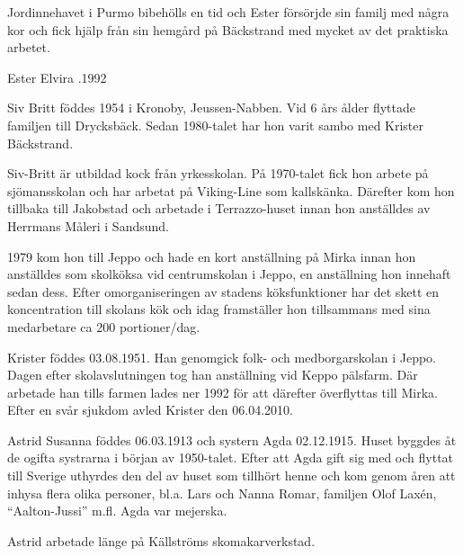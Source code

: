 Jordinnehavet i Purmo bibehölls en tid och Ester försörjde sin familj med några kor och fick hjälp från sin hemgård på Bäckstrand med mycket av det praktiska arbetet.

Ester Elvira .1992






Siv Britt föddes 1954 i Kronoby, Jeussen-Nabben. Vid 6 års ålder flyttade familjen till Drycksbäck. Sedan 1980-talet har hon varit sambo med Krister Bäckstrand.

Siv-Britt är utbildad kock från yrkesskolan. På 1970-talet fick hon arbete på sjömansskolan och  har arbetat på Viking-Line som kallskänka. Därefter kom hon tillbaka till Jakobstad och arbetade i Terrazzo-huset innan hon anställdes av Herrmans Måleri i Sandsund.

1979 kom hon till Jeppo och hade en kort anställning på Mirka innan hon anställdes som skolköksa vid centrumskolan i Jeppo, en anställning hon innehaft sedan dess. Efter omorganiseringen av stadens köksfunktioner har det skett en koncentration till skolans kök och idag framställer hon tillsammans med sina medarbetare ca 200 portioner/dag.


Krister föddes 03.08.1951. Han genomgick folk- och medborgarskolan i Jeppo. Dagen efter skolavslutningen tog han anställning vid Keppo pälsfarm. Där arbetade han tills farmen lades ner 1992 för att därefter överflyttas till Mirka. Efter en svår sjukdom avled Krister den 06.04.2010.


Astrid Susanna föddes 06.03.1913 och systern Agda 02.12.1915. Huset byggdes åt de ogifta systrarna i början av 1950-talet. Efter att Agda gift sig med  och flyttat till Sverige uthyrdes den del av huset som tillhört henne och kom genom åren att inhysa flera olika personer, bl.a. Lars och Nanna Romar, familjen Olof Laxén, ``Aalton-Jussi'' m.fl.
Agda var mejerska.

Astrid arbetade länge på Källströms skomakarverkstad.
\begin{jhchildren}
  \item {}
\end{jhchildren}

